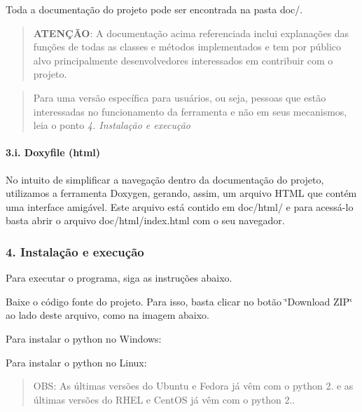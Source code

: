 Toda a documentação do projeto pode ser encontrada na pasta doc/.

\begin{quotation}
{\bfseries A\-T\-E\-NÇÃ\-O}\-: A documentação acima referenciada inclui explanações das funções de todas as classes e métodos implementados e tem por público alvo principalmente desenvolvedores interessados em contribuir com o projeto.

\end{quotation}


\begin{quotation}
Para uma versão específica para usuários, ou seja, pessoas que estão interessadas no funcionamento da ferramenta e não em seus mecanismos, leia o ponto {\itshape 4. Instalação e execução}

\end{quotation}


\paragraph*{3.\-i. Doxyfile (html)}

No intuito de simplificar a navegação dentro da documentação do projeto, utilizamos a ferramenta Doxygen, gerando, assim, um arquivo H\-T\-M\-L que contém uma interface amigável. Este arquivo está contido em doc/html/ e para acessá-\/lo basta abrir o arquivo doc/html/index.\-html com o seu navegador.

\subsubsection*{4. Instalação e execução}

Para executar o programa, siga as instruções abaixo.


\begin{DoxyEnumerate}
\item Baixe o código fonte do projeto. Para isso, basta clicar no botão \char`\"{}\-Download Z\-I\-P\char`\"{} ao lado deste arquivo, como na imagem abaixo. 
\item Para instalar o python no Windows\-:
\item Para instalar o python no Linux\-: \begin{quotation}
O\-B\-S\-: As últimas versões do Ubuntu e Fedora já vêm com o python 2. e as últimas versões do R\-H\-E\-L e Cent\-O\-S já vêm com o python 2..

\end{quotation}

\end{DoxyEnumerate}

